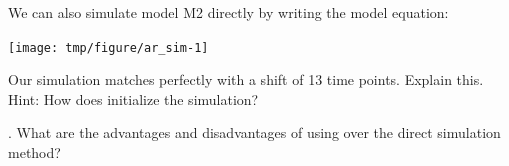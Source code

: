 \begin{frame}[fragile]
We can also simulate model M2 directly by writing the model equation:


\begin{knitrout}\small
{}\color{fgcolor}\begin{kframe}
\begin{alltt}
\hldef{(}\hldef{)}
 \hlkwb{<-} 
 \hlkwb{<-} 
\hldef{X[}\hldef{]} \hlkwb{<-} \hldef{(}\hldef{,}\hldef{=}\hldef{(}\hldef{))}
  \hlopt{:} \hlkwb{<-}  \hlopt{*} \hldef{X[n}\hlopt{-}\hldef{]} \hlopt{+} \hldef{(}\hldef{)}
\hldef{=}\hldef{)}
\hldef{(}\hlopt{-}\hldef{),}\hldef{=}\hldef{,}\hldef{=}\hldef{)}
\end{alltt}
\end{kframe}
\end{knitrout}


\begin{knitrout}\small
{}\color{fgcolor}

\texttt{[image: tmp/figure/ar\_sim-1]} \hfill{}


\end{knitrout}


Our simulation matches  perfectly with a shift of 13 time points. Explain this. Hint: How does  initialize the simulation?

\end{frame} 





\begin{frame}[fragile]


\myquestion. What are the advantages and disadvantages of using  over the direct simulation method?



\end{frame}

